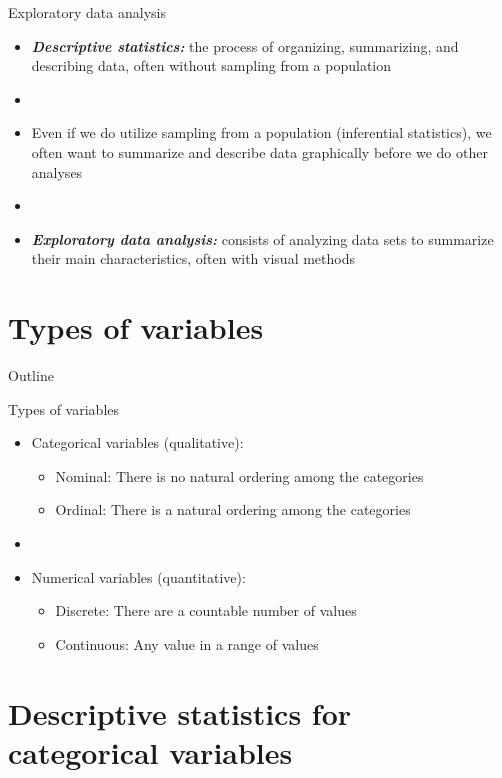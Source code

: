 \documentclass[xcolor=dvipsnames]{beamer}
\begin{document}
\begin{frame}{Exploratory data analysis}
	\begin{itemize}
		\item \textbf{\emph{Descriptive statistics:}} the process of organizing, summarizing, and describing data, often without sampling from a population
		\item[]
		\item Even if we do utilize sampling from a population (inferential statistics), we often want to summarize and describe data graphically before we do other analyses
		\item[]
		\item \textbf{\emph{Exploratory data analysis:}} consists of analyzing data sets to summarize their main characteristics, often with visual methods
	\end{itemize}
\end{frame}

\section{Types of variables}
\begin{frame}{Outline}
\tableofcontents[currentsection,subsectionstyle=show/shaded/hide]
\end{frame}

\begin{frame}{Types of variables}
\begin{itemize}
	\item Categorical variables (qualitative):
	\begin{itemize}
		\item Nominal: There is no natural ordering among the categories
		\item Ordinal: There is a natural ordering among the categories
	\end{itemize}
	\item[]
	\item Numerical variables (quantitative):
	\begin{itemize}
		\item Discrete: There are a countable number of values
		\item Continuous: Any value in a range of values
	\end{itemize}
\end{itemize}
\end{frame}

\section{Descriptive statistics for categorical variables}
\end{document}
